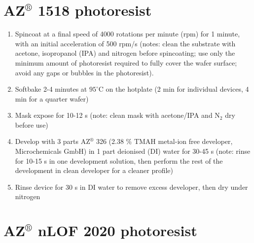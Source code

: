 \documentclass[
  a4paper,
]{scrbook}
\begin{document}
\hypertarget{azcircledr-1518-photoresist}{%
\section{\texorpdfstring{AZ\(^\circledR\) 1518
photoresist}{AZ\^{}\textbackslash circledR 1518 photoresist}}\label{azcircledr-1518-photoresist}}

\begin{enumerate}
\def\labelenumi{\arabic{enumi}.}
\item
  Spincoat at a final speed of 4000 rotations per minute (rpm) for 1
  minute, with an initial acceleration of 500 rpm/s (notes: clean the
  substrate with acetone, isopropanol (IPA) and nitrogen before
  spincoating; use only the minimum amount of photoresist required to
  fully cover the wafer surface; avoid any gaps or bubbles in the
  photoresist).
\item
  Softbake 2-4 minutes at \(95^\circ\)C on the hotplate (2 min for
  individual devices, 4 min for a quarter wafer)
\item
  Mask expose for 10-12 s (note: clean mask with acetone/IPA and N\(_2\)
  dry before use)
\item
  Develop with 3 parts AZ\(^\circledR\) 326 (2.38 \% TMAH metal-ion free
  developer, Microchemicals GmbH) in 1 part deionised (DI) water for
  30-45 s (note: rinse for 10-15 s in one development solution, then
  perform the rest of the development in clean developer for a cleaner
  profile)
\item
  Rinse device for 30 s in DI water to remove excess developer, then dry
  under nitrogen
\end{enumerate}

\hypertarget{azcircledr-nlof-2020-photoresist}{%
\section{\texorpdfstring{AZ\(^\circledR\) nLOF 2020
photoresist}{AZ\^{}\textbackslash circledR nLOF 2020 photoresist}}\label{azcircledr-nlof-2020-photoresist}}
\end{document}
